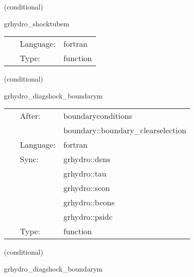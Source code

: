 \vspace{5mm}

   (conditional) 

\hspace{5mm} grhydro\_shocktubem 

\hspace{5mm}{\it shocktube initial data - mhd version } 


\hspace{5mm}

 \begin{tabular*}{160mm}{cll} 
~ & Language:  & fortran \\ 
~ & Type:  & function \\ 
\end{tabular*} 


\vspace{5mm}

   (conditional) 

\hspace{5mm} grhydro\_diagshock\_boundarym 

\hspace{5mm}{\it diagonal shock boundary conditions } 


\hspace{5mm}

 \begin{tabular*}{160mm}{cll} 
~ & After:  & boundaryconditions \\ 
~& ~ &boundary::boundary\_clearselection\\ 
~ & Language:  & fortran \\ 
~ & Sync:  & grhydro::dens \\ 
~& ~ &grhydro::tau\\ 
~& ~ &grhydro::scon\\ 
~& ~ &grhydro::bcons\\ 
~& ~ &grhydro::psidc\\ 
~ & Type:  & function \\ 
\end{tabular*} 


\vspace{5mm}

   (conditional) 

\hspace{5mm} grhydro\_diagshock\_boundarym 

\hspace{5mm}{\it diagonal shock boundary conditions } 


